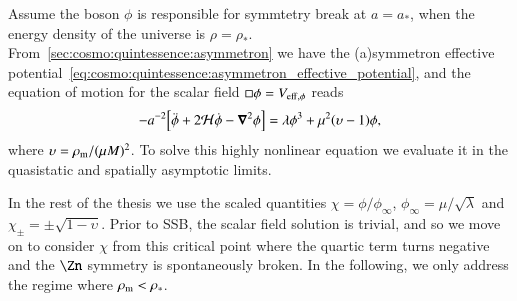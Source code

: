 


\newcommand{\eqregimenum}[1]{{\footnotesize{\textsf{\textbf{({#1})}}}}}
\newcommand{\brchi}{\breve{\chi}}


Assume the boson $\phi$ is responsible for symmtetry break at $a=a_\ast$, when the energy density of the universe is $\rho=\rho_\ast$. %
From~\cref{sec:cosmo:quintessence:asymmetron} we have the (a)symmetron effective potential~\cref{eq:cosmo:quintessence:asymmetron_effective_potential}, and the equation of motion for the scalar field $\sq \phi=V_{\mathrm{eff},\phi}$ reads
\begin{equation}
    -a^{-2} {\left[  \ddot{\phi} + 2\mathcal{H} \dot{\phi} - \boldsymbol{\nabla}^2\phi  \right]} = \lambda \phi^3 +\mu^2 {\left(  \upsilon-1 \right)}\phi,
\end{equation}
where $\upsilon=\rho_\mathrm{m}/(\mu M)^2$. %
To solve this highly nonlinear equation we evaluate it in the quasistatic and spatially asymptotic limits. 


In the rest of the thesis we use the scaled quantities $\chi=\phi/\phi_\infty$, $\phi_\infty=\mu/\sqrt{\lambda}$ and $\chi_\pm=\pm\sqrt{1-\upsilon}$. Prior to SSB, the scalar field solution is trivial, and so we move on to consider $\chi$ from this critical point where the quartic term turns negative and the $\Zn$ symmetry is spontaneously broken. In the following, we only address the regime where $\rho_\mathrm{m}< \rho_\ast$.













